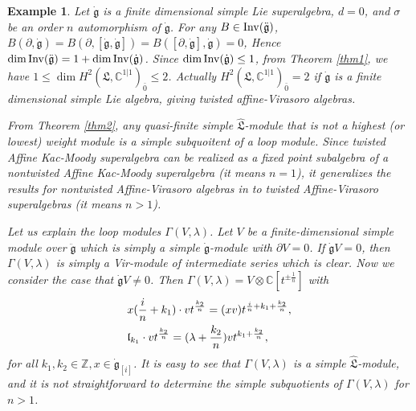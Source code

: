 \documentclass[1p]{elsarticle}
\numberwithin{equation}{section}
\def\dg{\dot{\mathfrak{g}}}
\def\ddg{\ddot{\mathfrak{g}}}
\def\fL{\mathfrak{L}}
\def\bC{\mathbb{C}}
\def\bZ{\mathbb{Z}}
\def\Inv{{\rm Inv}}
\def\fl{\mathfrak{l}}
\def\hL{\hat{\fL}}
\newtheorem{exam}{Example}
\begin{document}
\begin{exam} Let $\dg$ is a finite dimensional simple Lie superalgebra, $d=0$, and $\sigma$ be an order $n$ automorphism of $\dg$. For any $B\in \Inv(\ddg)$, $B(\partial, \dg)=B(\partial,[\dg,\dg])=B([\partial,\dg],\dg)=0$, Hence $\dim \Inv(\ddg)=1+\dim \Inv(\dg)$. Since $\dim \Inv(\dg)\le 1$,  from Theorem \ref{thm1}, we have $1\le \dim H^2(\fL,\bC^{1|1})_{\bar 0}\le 2$. Actually $H^2(\fL,\bC^{1|1})_{\bar 0}= 2$ if $\dg$ is a finite dimensional simple Lie algebra, giving twisted affine-Virasoro algebras.
	
	
	From Theorem \ref{thm2}, any quasi-finite simple $\hL$-module that is not a highest (or lowest) weight module is a simple subquoitent of a loop module. Since twisted Affine Kac-Moody superalgebra can be realized as a fixed point subalgebra of a nontwisted Affine Kac-Moody superalgebra (it means $n=1$), it generalizes the results for nontwisted Affine-Virasoro algebras  in \cite{LPX} to twisted Affine-Virasoro superalgebras (it means $n>1$). 
	
	Let us explain the loop modules $\Gamma(V, \lambda)$. Let $V$ be a finite-dimensional simple module over $\ddg$ which is simply a simple $\dg$-module with $\partial V=0$. If $\dg V=0$, then $\Gamma(V, \lambda)$ is simply a Vir-module of intermediate series which is clear. Now we consider the case that $\dg V\ne 0$.
	Then $\Gamma(V, \lambda)=V\otimes \bC[t^{\pm \frac1n}]$ with 
		$$\aligned  &x(\frac {i}n+k_1)\cdot vt^{\frac{k_2}{n}}=(xv)t^{\frac {i}n+k_1+\frac{k_2}{n}},\\
	&\fl_{k_1}\cdot vt^{\frac{k_2}{n}}=(\lambda+\frac{k_2}{n})vt^{ {k_1}+\frac{k_2}{n}},
	\endaligned$$
	for all $k_1, k_2\in\bZ, x\in\dg_{[i]}$. It is easy to see that $\Gamma(V, \lambda)$ is a simple $\hL$-module, and it is not straightforward to determine the simple subquotients of $\Gamma(V, \lambda)$ for $n>1$.
	\end{exam}
\end{document}

